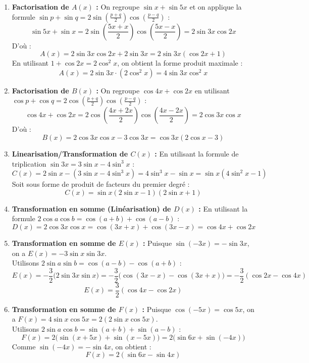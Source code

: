 \documentclass[12pt,a4paper]{article}
\begin{document}
\begin{enumerate}
    \item \textbf{Factorisation de $A(x)$ :}
    On regroupe $\sin x + \sin 5x$ et on applique la formule $\sin p + \sin q = 2 \sin\left(\frac{p+q}{2}\right) \cos\left(\frac{p-q}{2}\right)$ :
    \[
    \sin 5x + \sin x = 2 \sin\left(\frac{5x+x}{2}\right) \cos\left(\frac{5x-x}{2}\right) = 2 \sin 3x \cos 2x
    \]
    D'où :
    \[
    A(x) = 2 \sin 3x \cos 2x + 2 \sin 3x = 2 \sin 3x (\cos 2x + 1)
    \]
    En utilisant $1 + \cos 2x = 2 \cos^2 x$, on obtient la forme produit maximale :
    \[
    A(x) = 2 \sin 3x \cdot (2 \cos^2 x) = 4 \sin 3x \cos^2 x
    \]

    \item \textbf{Factorisation de $B(x)$ :}
    On regroupe $\cos 4x + \cos 2x$ en utilisant $\cos p + \cos q = 2 \cos\left(\frac{p+q}{2}\right) \cos\left(\frac{p-q}{2}\right)$ :
    \[
    \cos 4x + \cos 2x = 2 \cos\left(\frac{4x+2x}{2}\right) \cos\left(\frac{4x-2x}{2}\right) = 2 \cos 3x \cos x
    \]
    D'où :
    \[
    B(x) = 2 \cos 3x \cos x - 3 \cos 3x = \cos 3x (2 \cos x - 3)
    \]

    \item \textbf{Linearisation/Transformation de $C(x)$ :}
    En utilisant la formule de triplication $\sin 3x = 3\sin x - 4\sin^3 x$ :
    \[
    C(x) = 2\sin x - (3\sin x - 4\sin^3 x) = 4\sin^3 x - \sin x = \sin x (4\sin^2 x - 1)
    \]
    Soit sous forme de produit de facteurs du premier degré :
    \[
    C(x) = \sin x (2\sin x - 1)(2\sin x + 1)
    \]

    \item \textbf{Transformation en somme (Linéarisation) de $D(x)$ :}
    En utilisant la formule $2 \cos a \cos b = \cos(a+b) + \cos(a-b)$ :
    \[
    D(x) = 2 \cos 3x \cos x = \cos(3x+x) + \cos(3x-x) = \cos 4x + \cos 2x
    \]

    \item \textbf{Transformation en somme de $E(x)$ :}
    Puisque $\sin(-3x) = -\sin 3x$, on a $E(x) = -3 \sin x \sin 3x$. \\
    Utilisons $2 \sin a \sin b = \cos(a-b) - \cos(a+b)$ :
    \[
    E(x) = -\frac{3}{2} \Big(2 \sin 3x \sin x\Big) = -\frac{3}{2} \Big(\cos(3x-x) - \cos(3x+x)\Big) = -\frac{3}{2} (\cos 2x - \cos 4x)
    \]
    \[
    E(x) = \frac{3}{2} (\cos 4x - \cos 2x)
    \]

    \item \textbf{Transformation en somme de $F(x)$ :}
    Puisque $\cos(-5x) = \cos 5x$, on a $F(x) = 4 \sin x \cos 5x = 2 (2 \sin x \cos 5x)$. \\
    Utilisons $2 \sin a \cos b = \sin(a+b) + \sin(a-b)$ :
    \[
    F(x) = 2 \Big(\sin(x+5x) + \sin(x-5x)\Big) = 2 \Big(\sin 6x + \sin(-4x)\Big)
    \]
    Comme $\sin(-4x) = -\sin 4x$, on obtient :
    \[
    F(x) = 2 (\sin 6x - \sin 4x)
    \]
\end{enumerate}
\end{document}
